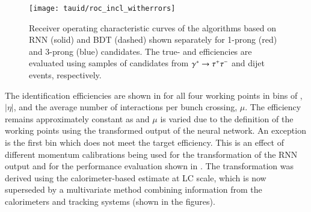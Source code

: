 \begin{figure}[htbp]
  \centering

  \texttt{[image: tauid/roc\_incl\_witherrors]}

  \caption[Receiver operating characteristic curves of the \tauid algorithms
  based on RNN and BDT]{Receiver operating characteristic curves of the \tauid
    algorithms based on RNN (solid) and BDT (dashed) shown separately for
    1-prong (red) and 3-prong (blue) \tauhadvis candidates. The true- and
    \faketauhadvis efficiencies are evaluated using samples of \tauhadvis
    candidates from $\gamma^{*} \to \tau^{+} \tau^{-}$ and dijet events, respectively.}%
  \label{fig:tauid_rnn_bdt_roc_comparison}
\end{figure}

The \tauhadvis identification efficiencies
are shown in  for all four working points in bins of
\tauhadvis \pT, \tauhadvis $|\eta|$, and the average number of interactions per
bunch crossing, $\mu$. The efficiency remains approximately constant as
\tauhadvis \pT and $\mu$ is varied due to the definition of the working points
using the transformed output of the neural network. An exception is the first
\tauhadvis \pT bin which does not meet the target efficiency. This is an effect
of different \tauhadvis momentum calibrations being used for the transformation
of the RNN output and for the performance evaluation shown in
. The transformation was
derived using the calorimeter-based \tauhadvis \pT estimate at LC scale, which
is now superseded by a multivariate method combining information from the
calorimeters and tracking systems (shown in the figures).


